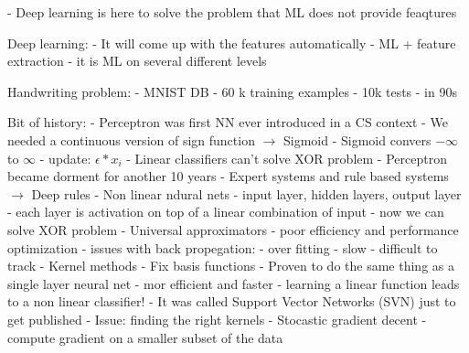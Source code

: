 - Deep learning is here to solve the problem that ML does not provide feaqtures


Deep learning:
- It will come up with the features automatically
- ML + feature extraction
- it is ML on several different levels

Handwriting problem:
- MNIST DB
 - 60 k training examples
 - 10k tests
 - in 90s

Bit of history:
- Perceptron was first NN ever introduced in a CS context
 - We needed a continuous version of sign function $\rightarrow$ Sigmoid
 - Sigmoid convers $-\infty$ to $\infty$
 - update: $\epsilon * x_i$
 - Linear classifiers can't solve XOR problem
 - Perceptron became dorment for another 10 years
- Expert systems and rule based systems $\rightarrow$ Deep rules
- Non linear ndural nets
 - input layer, hidden layers, output layer
 - each layer is activation on top of a linear combination of input
 - now we can solve XOR problem
 - Universal approximators
 - poor efficiency and performance optimization
 - issues with back propegation:
  - over fitting
  - slow
  - difficult to track
- Kernel methods
 - Fix basis functions
 - Proven to do the same thing as a single layer neural net
 - mor efficient and faster
 - learning a linear function leads to a non linear classifier!
 - It was called Support Vector Networks (SVN) just to get published
 - Issue: finding the right kernels
- Stocastic gradient decent
 - compute gradient on a smaller subset of the data

